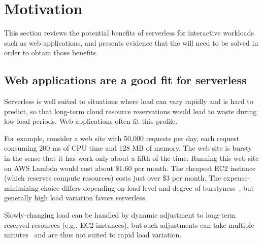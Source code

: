 \section{Motivation}\label{s:motivation}

This section reviews the potential benefits of serverless for
interactive workloads such as web applications, and presents
evidence that the {\problem} will need to be solved in order to
obtain those benefits.












\subsection{Web applications are a good fit for serverless}

Serverless is well suited to situations where load can vary rapidly
and is hard to predict, so that long-term cloud resource reservations
would lead to waste during low-load periods. Web applications often
fit this profile.

For example, consider a web site with 50,000 requests per day, each
request consuming 200 ms of CPU time and 128 MB of memory. The web
site is bursty in the sense that it has work only about a fifth of the
time. Running this web site on AWS Lambda would cost about \$1.60 per
month.
The cheapest EC2 instance (which reserves compute resources)
costs just over \$3 per month. The expense-minimizing choice differs
depending on load level and degree of
burstyness~\cite{econ-of-serverless,trek10-blog},
but generally high load variation favors serverless.

Slowly-changing load can be handled by dynamic adjustment to long-term
reserved resources (e.g., EC2 instances), but such adjustments can take
multiple minutes~\cite{ec2-autoscaling} and are thus not suited to
rapid load variation.


